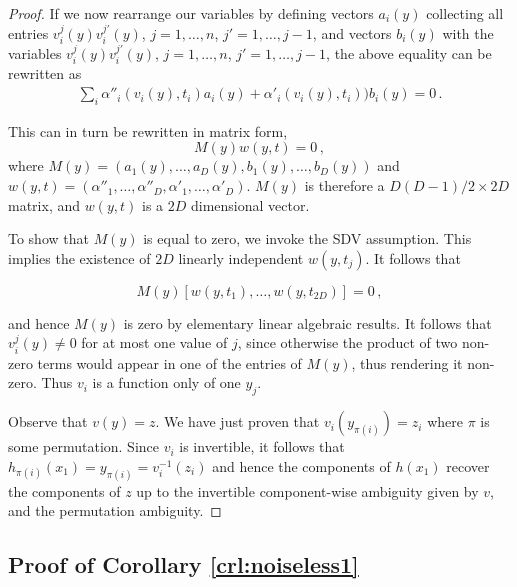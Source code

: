 \begin{proof}
	If we now rearrange our variables by defining vectors ${a}_i({y})$ collecting all entries $v_i^j({y})v_i^{j'}({y})$, $j=1, \ldots, n$, $j'=1, \ldots, j-1$, and vectors ${b}_i({y})$ with the variables $v_i^j({y})v_i^{j'}({y})$, $j=1, \ldots, n$, $j'=1, \ldots, j-1$, the above equality can be rewritten as
	\begin{align*}
	\sum_{i} \alpha''_{i}(v_{i}({y}), t_{i}){a}_i({y}) + \alpha'_{i}(v_{i}({y}),  t_{i})){b}_i({y})=0\,.
	\end{align*}
	
This can in turn be rewritten in matrix form,
	\[
	{M}({y}){w}({y}, {t})=0\,,
	\]
	where ${M}({y}) = ({a}_1({y}), \ldots,  {a}_D({y}), {b}_1({y}), \ldots, {b}_D({y})) $ and ${w}({y}, {t}) = (\alpha''_{1}, \ldots, \alpha''_{D}, \alpha'_{1}, \ldots,\alpha'_{D})$. ${M}({y})$ is therefore a $D(D-1)/2 \times 2D$ matrix, and ${w}({y}, {t})$ is a $2D$ dimensional vector.
	
	To show that ${M}({y})$ is equal to zero, we invoke the SDV assumption.
	This implies the existence of $2D$ linearly independent ${w}({y}, {t}_j)$.
	It follows that
	
	\[
	{M}({y})[{w}({y}, {t}_1), \ldots, {w}({y}, {t}_{2D})]=0\,,
	\]
	
	and hence ${M}({y})$ is zero by elementary linear algebraic results.
	It follows that $v_i^j({y})\not=0$ for at most one value of $j$, since otherwise the product of two non-zero terms would appear in one of the entries of ${M}({y})$, thus rendering it non-zero.
	Thus $v_i$ is a function only of one $y_j$.
	
	Observe that ${v}({y}) = {z}$.
	We have just proven that $v_i(y_{\pi(i)}) = z_i$ where $\pi$ is some permutation.
	Since $v_i$ is invertible, it follows that $h_{\pi(i)}({x}_{1}) = y_{\pi(i)} = v_i^{-1}(z_i)$ and hence the components of ${h}({x}_{1})$ recover the components of ${z}$ up to the invertible component-wise ambiguity given by ${v}$, and the permutation ambiguity.
	
\end{proof}

\subsection{Proof of Corollary \ref{crl:noiseless1}}\label{appendix:proof-cor2}

